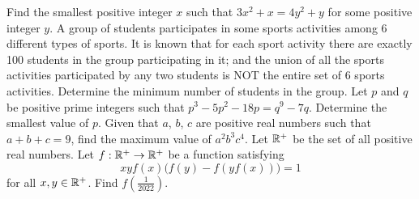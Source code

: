 \begin{enumerate}
\begin{center}
    \end{center}
    \hyperrefitem[Q::2022-O-1-21] Find the smallest positive integer $x$ such that $3x^2 + x = 4y^2 + y$ for some positive integer $y$.
    \hyperrefitem[Q::2022-O-1-22] A group of students participates in some sports activities among 6 different types of sports. It is known that for each sport activity there are exactly 100 students in the group participating in it; and the union of all the sports activities participated by any two students is NOT the entire set of 6 sports activities. Determine the minimum number of students in the group.
    \hyperrefitem[Q::2022-O-1-23] Let $p$ and $q$ be positive prime integers such that $p^3 - 5p^2 - 18p = q^9 - 7q$. Determine the smallest value of $p$.
    \hyperrefitem[Q::2022-O-1-24] Given that $a$, $b$, $c$ are positive real numbers such that $a + b + c = 9$, find the maximum value of $a^2 b^3 c^4$.
    \hyperrefitem[Q::2022-O-1-25] Let $\mathbb{R}^+$ be the set of all positive real numbers. Let $f : \mathbb{R}^+ \to \mathbb{R}^+$ be a function satisfying \[xy f(x) \big(f(y) - f(yf(x))\big) = 1\] for all $x, y \in \mathbb{R}^+$. Find $f(\frac1{2022})$.
\end{enumerate}